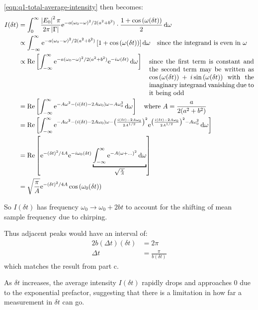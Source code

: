 \begin{parts}
	\eqref{eqn:q1-total-average-intensity} then becomes:
	\begin{align*}
		I(\delta t) &= \defint{0}{\infty}{
			\frac{\abs{E_0}^2 \pi}{2\pi \abs{\Gamma}} \mathrm{e}^{-a(\omega_0 - \omega)^2 / 2(a^2+b^2)} \cdot \frac{1 + \cos\rbracket{\omega (\delta t)}}{2}
		}{\omega} \\
		&\propto \defint{-\infty}{\infty}{
			\mathrm{e}^{-a(\omega_0 - \omega)^2 / 2(a^2+b^2)} \sbracket{1 + \cos\rbracket{\omega (\delta t)}}
		}{\omega} \mtext{since the integrand is even in $\omega$} \\
		&\propto \textnormal{Re} \sbracket{
			\defint{-\infty}{\infty}{
				\mathrm{e}^{-a(\omega_0 - \omega)^2 / 2(a^2+b^2)} \mathrm{e}^{-i\omega(\delta t)}
				}{\omega}}
			\mtext{\parbox[t]{16em}{since the first term is constant and the second term may be written as $\cos\rbracket{\omega(\delta t)} + i\sin\rbracket{\omega(\delta t)}$ with the imaginary integrand vanishing due to it being odd}} \\
		&= \textnormal{Re} \sbracket{\defint{-\infty}{\infty}{\mathrm{e}^{-A\omega^2 - \rbracket{i(\delta t)-2A\omega_0}\omega - A\omega_0^2}}{\omega}} \mtext{where $A = \dfrac{a}{2(a^2+b^2)}$} \\
		&= \textnormal{Re} \sbracket{
			\defint{-\infty}{\infty}{
				\mathrm{e}^{-A\omega^2 - \rbracket{i(\delta t)-2A\omega_0}\omega - \rbracket{\frac{i(\delta t) - 2A\omega_0}{2A^{1/2}}}^2}
				\mathrm{e}^{\rbracket{
						\frac{i(\delta t) - 2A\omega_0}{2A^{1/2}}
					}^2 - A\omega_0^2}
			}{\omega}
		} \\
		&= \textnormal{Re} \sbracket{
				\mathrm{e}^{-(\delta t)^2/4A} \mathrm{e}^{-i\omega_0 (\delta t)} 
				\underbracket{
					\defint{-\infty}{\infty}{
						\mathrm{e}^{-A(\omega + \ldots)^2}
					}{\omega}}
				_{\sqrt{\frac{\pi}{A}}}
			} \\
		&= \sqrt{\frac{\pi}{A}} \mathrm{e}^{-(\delta t)^2/4A} \cos\rbracket{\omega_0 (\delta t)}
	\end{align*}
	
	So $I(\delta t)$ has frequency $\omega_0 \rightarrow \omega_0+2bt$ to account for the shifting of mean sample frequency due to chirping.
	
	Thus adjacent peaks would have an interval of:
	\begin{align*}
		2b(\Delta t)(\delta t) &= 2\pi \\
		\Delta t &= \frac{\pi}{b(\delta t)}
	\end{align*}
	which matches the result from part c.
	
	As $\delta t$ increases, the average intensity $I(\delta t)$ rapidly drops and approaches $0$ due to the exponential prefactor, suggesting that there is a limitation in how far a measurement in $\delta t$ can go.
\end{parts}